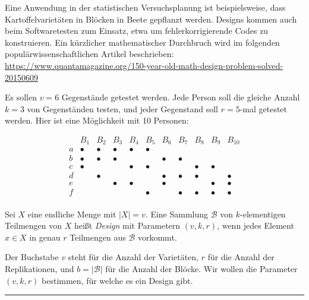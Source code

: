 \documentclass[9pt]{article}
\begin{document}
Eine Anwendung in der statistischen Versuchsplanung ist beispielsweise, dass Kartoffelvarietäten in Blöcken in Beete gepflanzt werden. Designs kommen auch beim Softwaretesten zum Einsatz, etwa um fehlerkorrigierende Codes zu konstruieren. Ein kürzlicher mathematischer Durchbruch wird im folgenden populärwissenschaftlichen Artikel beschrieben:  
\url{https://www.quantamagazine.org/150-year-old-math-design-problem-solved-20150609}

\begin{prob} \label{prob5-1}
Es sollen $v = 6$ Gegenstände getestet werden. Jede Person soll die gleiche Anzahl $k = 3$ von Gegenständen testen, und jeder Gegenstand soll $r = 5$-mal getestet werden. Hier ist eine Möglichkeit mit 10 Personen:

\[
\begin{array}{c|cccccccccc}
    & B_1 & B_2 & B_3 & B_4 & B_5 & B_6 & B_7 & B_8 & B_9 & B_{10} \\
\hline
a & \bullet & \bullet & \bullet & \bullet & \bullet &  & & & & \\
b & \bullet & \bullet & \bullet & & & \bullet & \bullet &  &  &  \\
c & \bullet & & &  \bullet & \bullet & & & \bullet & \bullet &  \\
d & & \bullet &  &  &  & \bullet & \bullet & \bullet & & \bullet \\
e &  & & \bullet & \bullet &  & \bullet & &  & \bullet & \bullet \\
f &  & & &  & \bullet &  & \bullet & \bullet & \bullet & \bullet \\
\end{array}
\]
\end{prob}
\explaindesign
\begin{defi}
Sei $X$ eine endliche Menge mit $|X| = v$. Eine Sammlung $\mathcal{B}$ von $k$-elementigen Teilmengen von $X$ heißt \textit{Design} mit Parametern $(v, k, r)$, wenn jedes Element $x \in X$ in genau $r$ Teilmengen aus $\mathcal{B}$ vorkommt.  

Der Buchstabe $v$ steht für die Anzahl der Varietäten, $r$ für die Anzahl der Replikationen, und $b = |\mathcal{B}|$ für die Anzahl der Blöcke. Wir wollen die Parameter $(v, k, r)$ bestimmen, für welche es ein Design gibt.  
\end{defi} \noindent \rule{8cm}{0.4pt}
\end{document}
